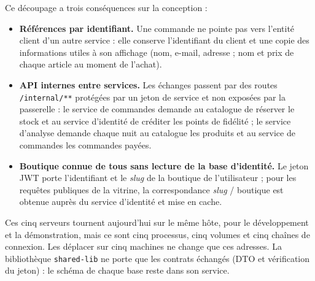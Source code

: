 Ce découpage a trois conséquences sur la conception :
\begin{itemize}
  \item \textbf{Références par identifiant.} Une commande ne pointe pas vers l'entité client d'un autre service : elle conserve l'identifiant du client et une copie des informations utiles à son affichage (nom, e-mail, adresse ; nom et prix de chaque article au moment de l'achat).
  \item \textbf{API internes entre services.} Les échanges passent par des routes \texttt{/internal/**} protégées par un jeton de service et non exposées par la passerelle : le service de commandes demande au catalogue de réserver le stock et au service d'identité de créditer les points de fidélité ; le service d'analyse demande chaque nuit au catalogue les produits et au service de commandes les commandes payées.
  \item \textbf{Boutique connue de tous sans lecture de la base d'identité.} Le jeton JWT porte l'identifiant et le \textit{slug} de la boutique de l'utilisateur ; pour les requêtes publiques de la vitrine, la correspondance \textit{slug} / boutique est obtenue auprès du service d'identité et mise en cache.
\end{itemize}

Ces cinq serveurs tournent aujourd'hui sur le même hôte, pour le développement et la démonstration, mais ce sont cinq processus, cinq volumes et cinq chaînes de connexion. Les déplacer sur cinq machines ne change que ces adresses. La bibliothèque \texttt{shared-lib} ne porte que les contrats échangés (DTO et vérification du jeton) : le schéma de chaque base reste dans son service.

